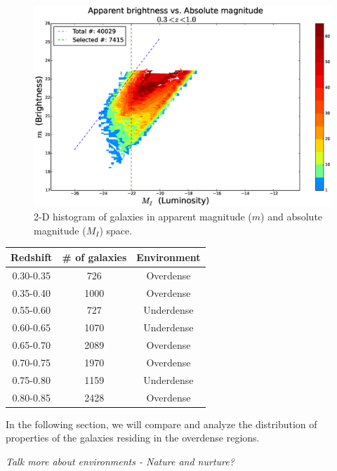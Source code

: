 \documentclass[twocolumn,useAMS,usenatbib]{mn2e}
\begin{document}
\begin{figure}
  \centering
   \includegraphics[width=\columnwidth]{hist2d_mag_mi}
   \caption{2-D histogram of galaxies in apparent magnitude ($m$) and absolute magnitude ($M_I$) space.}
   \label{fig:2Dhist}
 \end{figure}
  

\begin{tabular}{c|c|c|}
 \hline
 Redshift & \# of galaxies & Environment \\
 \hline
 0.30-0.35 & 726 & Overdense \\
 0.35-0.40 & 1000 & Overdense \\
 0.55-0.60 & 727 & Underdense \\
 0.60-0.65 & 1070 & Underdense \\
 0.65-0.70 & 2089 & Overdense \\
 0.70-0.75 & 1970 & Overdense \\
 0.75-0.80 & 1159 & Underdense \\
 0.80-0.85 & 2428 & Overdense \\
 \hline
\end{tabular}

In the following section, we will compare and analyze the distribution of properties of the galaxies residing in the overdense regions.

\emph{Talk more about environments - Nature and nurture?}

\end{document}
